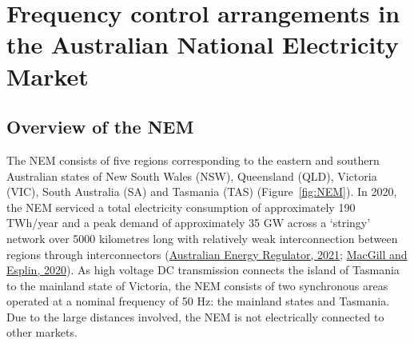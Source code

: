 \documentclass[12pt,a4paper,]{report}
\begin{document}
\hypertarget{sec:fcs-nem}{%
\section{Frequency control arrangements in the Australian National
Electricity Market}\label{sec:fcs-nem}}

\hypertarget{overview-of-the-nem}{%
\subsection{Overview of the NEM}\label{overview-of-the-nem}}

The NEM consists of five regions corresponding to the eastern and
southern Australian states of New South Wales (NSW), Queensland (QLD),
Victoria (VIC), South Australia (SA) and Tasmania (TAS)
(Figure~\ref{fig:NEM}). In 2020, the NEM serviced a total electricity
consumption of approximately 190 TWh/year and a peak demand of
approximately 35 GW across a `stringy' network over 5000 kilometres long
with relatively weak interconnection between regions through
interconnectors
(\protect\hyperlink{ref-australianenergyregulatorStateEnergyMarket2021}{Australian
Energy Regulator, 2021};
\protect\hyperlink{ref-macgillEndtoendElectricityMarket2020}{MacGill and
Esplin, 2020}). As high voltage DC transmission connects the island of
Tasmania to the mainland state of Victoria, the NEM consists of two
synchronous areas operated at a nominal frequency of 50 Hz: the mainland
states and Tasmania. Due to the large distances involved, the NEM is not
electrically connected to other markets.
\end{document}
